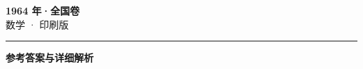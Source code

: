 \documentclass[zihao=5, a4paper]{ctexart}
\begin{document}
\begin{center}
  {\Large\bfseries 1964 年·全国卷}\\[4pt]
  {\large 数学 · 印刷版}
\end{center}
\medskip
{}

\par\bigskip\hrule\bigskip
{}
\begin{center}{\large\bfseries 参考答案与详细解析}\end{center}
\smallskip

\end{document}
